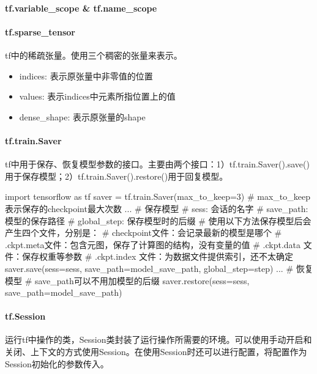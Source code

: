 \paragraph{tf.variable\_scope \& tf.name\_scope}

\paragraph{tf.sparse\_tensor}	tf中的稀疏张量。使用三个稠密的张量来表示。
\begin{itemize}
	\item indices: 表示原张量中非零值的位置
	\item values: 表示indices中元素所指位置上的值
	\item dense\_shape: 表示原张量的shape
\end{itemize}

\paragraph{tf.train.Saver}tf中用于保存、恢复模型参数的接口。主要由两个接口：1）tf.train.Saver().save()用于保存模型；2）tf.train.Saver().restore()用于回复模型。
\begin{python}
	import tensorflow as tf
	saver = tf.train.Saver(max\_to\_keep=3) # max\_to\_keep表示保存的checkpoint最大次数
	...
	# 保存模型
	# sess: 会话的名字
	# save\_path: 模型的保存路径
	# global\_step: 保存模型时的后缀
	# 使用以下方法保存模型后会产生四个文件，分别是：
	# checkpoint文件：会记录最新的模型是哪个
	# .ckpt.meta文件：包含元图，保存了计算图的结构，没有变量的值
	# .ckpt.data 文件：保存权重等参数
	# .ckpt.index 文件：为数据文件提供索引，{还不太确定}
	saver.save(sess=sess, save_path=model_save_path, global_step=step)
	...
	# 恢复模型
	# save_path可以不用加模型的后缀
	saver.restore(sess=sess, save_path=model_save_path)
\end{python}

\paragraph{tf.Session}运行tf中操作的类，Session类封装了运行操作所需要的环境。可以使用手动开启和关闭、上下文的方式使用Session。在使用Session时还可以进行配置，将配置作为Session初始化的参数传入。

